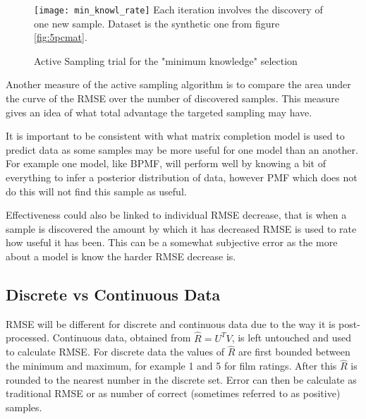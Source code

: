 \begin{figure}[!htbp]
  \begin{center}
    \texttt{[image: min\_knowl\_rate]}
    Each iteration involves the discovery of one new sample. Dataset is the synthetic one from figure \ref{fig:5pcmat}.
    \caption{Active Sampling trial for the "minimum knowledge" selection}
    \label{fig:al_minknowl}
  \end{center}
\end{figure}

Another measure of the active sampling algorithm is to compare the area under the curve of the RMSE over the number of discovered samples. This measure gives an idea of what total advantage the targeted sampling may have.



It is important to be consistent with what matrix completion model is used to predict data as some samples may be more useful for one model than an another. For example one model, like BPMF, will perform well by knowing a bit of everything to infer a posterior distribution of data, however PMF which does not do this will not find this sample as useful.

Effectiveness could also be linked to individual RMSE decrease, that is when a sample is discovered the amount by which it has decreased RMSE is used to rate how useful it has been. This can be a somewhat subjective error as the more about a model is know the harder RMSE decrease is.

\subsection{Discrete vs Continuous Data}
RMSE will be different for discrete and continuous data due to the way it is post-processed. Continuous data, obtained from $\hat{R}=U^TV$, is left untouched and used to calculate RMSE. For discrete data the values of $\hat{R}$ are first bounded between the minimum and maximum, for example 1 and 5 for film ratings. After this $\hat{R}$ is rounded to the nearest number in the discrete set. Error can then be calculate as traditional RMSE or as number of correct (sometimes referred to as positive) samples\cite{recsyshand}.

